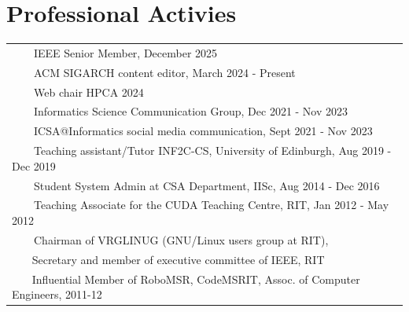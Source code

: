 \documentclass[a4paper,10pt]{article} %
\newcommand{\tabitem}{~~\llap{\textbullet}~~}
\begin{document}
\section{Professional Activies}
\hskip-0.4cm
\begin{tabular}{l}
	\tabitem IEEE Senior Member, December 2025\\
	\tabitem ACM SIGARCH content editor, March 2024 - Present\\
	\tabitem Web chair HPCA 2024 \\
    \tabitem Informatics Science Communication Group, Dec 2021 - Nov 2023 \\
	\tabitem ICSA@Informatics social media communication, Sept 2021 - Nov 2023 \\
	\tabitem Teaching assistant/Tutor INF2C-CS, University of Edinburgh, Aug 2019 - Dec 2019 \\
	\tabitem Student System Admin at CSA Department, IISc, Aug 2014 - Dec 2016 \\
	\tabitem Teaching Associate for the CUDA Teaching Centre, RIT, Jan 2012 - May 2012 \\
	\tabitem Chairman of VRGLINUG (GNU/Linux users group at RIT), \\
	~~~ Secretary and member of executive committee of IEEE, RIT  \\
	~~~ Influential Member of {\footnotesize RoboMSR, CodeMSRIT, Assoc. of Computer Engineers}, 2011-12 \\
\end{tabular}

\vspace{0.05in}
\end{document}
